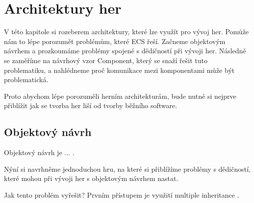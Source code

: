
\chapter{Architektury her}
V této kapitole si rozeberem architektury, které lze využít pro vývoj her. Pomůže nám to lépe porozumět problémům, které ECS řeší. Začneme objektovým návrhem a prozkoumáme problémy spojené s dědičností při vývoji her. Následně se zaměříme na návrhový vzor Component, který se snaží řešit tuto problematiku, a nahlédneme proč komunikace mezi komponentami může být problematická.

Proto abychom lépe porozuměli herním architekturám, bude nutné si nejprve přiblížit jak se tvorba her liší od tvorby běžního software.


\section{Objektový návrh}
Objektový návrh je ... .

Nýní si navrhněme jednoduchou hru, na které si přiblížíme problémy s dědičností, které mohou při vývoji her s objektovým návrhem nastat.

Jak tento problém vyřešit? Prvním přístupem je využití multiple inheritance .

